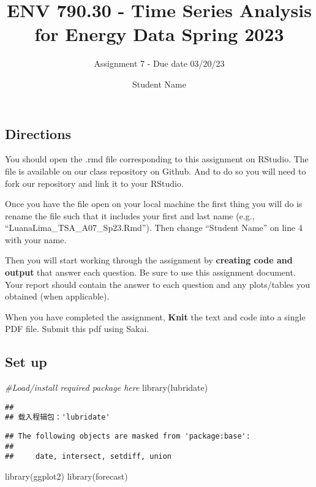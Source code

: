 \documentclass[
]{article}
\title{ENV 790.30 - Time Series Analysis for Energy Data \textbar{}
Spring 2023}
\subtitle{Assignment 7 - Due date 03/20/23}
\author{Student Name}
\date{}
\newenvironment{Shaded}{\begin{snugshade}}{\end{snugshade}}
\newcommand{\CommentTok}[1]{\textcolor[rgb]{0.56,0.35,0.01}{\textit{#1}}}
\newcommand{\FunctionTok}[1]{\textcolor[rgb]{0.00,0.00,0.00}{#1}}
\newcommand{\NormalTok}[1]{#1}
\begin{document}
\maketitle

\hypertarget{directions}{%
\subsection{Directions}\label{directions}}

You should open the .rmd file corresponding to this assignment on
RStudio. The file is available on our class repository on Github. And to
do so you will need to fork our repository and link it to your RStudio.

Once you have the file open on your local machine the first thing you
will do is rename the file such that it includes your first and last
name (e.g., ``LuanaLima\_TSA\_A07\_Sp23.Rmd''). Then change ``Student
Name'' on line 4 with your name.

Then you will start working through the assignment by \textbf{creating
code and output} that answer each question. Be sure to use this
assignment document. Your report should contain the answer to each
question and any plots/tables you obtained (when applicable).

When you have completed the assignment, \textbf{Knit} the text and code
into a single PDF file. Submit this pdf using Sakai.

\hypertarget{set-up}{%
\subsection{Set up}\label{set-up}}

\begin{Shaded}
\begin{Highlighting}[]
\CommentTok{\#Load/install required package here}
\FunctionTok{library}\NormalTok{(lubridate)}
\end{Highlighting}
\end{Shaded}

\begin{verbatim}
## 
## 载入程辑包：'lubridate'
\end{verbatim}

\begin{verbatim}
## The following objects are masked from 'package:base':
## 
##     date, intersect, setdiff, union
\end{verbatim}

\begin{Shaded}
\begin{Highlighting}[]
\FunctionTok{library}\NormalTok{(ggplot2)}
\FunctionTok{library}\NormalTok{(forecast)  }
\end{Highlighting}
\end{Shaded}
\end{document}
